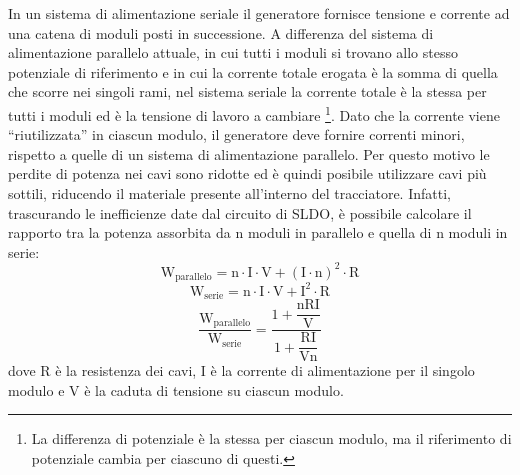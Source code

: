In un sistema di alimentazione seriale il generatore fornisce tensione e corrente ad una catena di moduli posti in successione. 
A differenza del sistema di alimentazione parallelo attuale, in cui tutti i moduli si trovano allo stesso potenziale di riferimento e in cui la corrente totale erogata è la somma di quella che scorre nei singoli rami, nel sistema seriale la corrente totale è la stessa per tutti i moduli ed è la tensione di lavoro a cambiare
\footnote{
  La differenza di potenziale è la stessa per ciascun modulo, ma il riferimento di potenziale cambia per ciascuno di questi.
}.
Dato che la corrente viene ``riutilizzata'' in ciascun modulo, il generatore deve fornire correnti minori, rispetto a quelle di un sistema di alimentazione parallelo.
Per questo motivo le perdite di potenza nei cavi sono ridotte ed è quindi posibile utilizzare cavi più sottili, riducendo il materiale presente all'interno del tracciatore.
Infatti, trascurando le inefficienze date dal circuito di SLDO, è possibile calcolare il rapporto tra la potenza assorbita da n moduli in parallelo e quella di n moduli in serie:
\begin{equation}
\mathrm{W_{parallelo} = n \cdot I \cdot V + (I\cdot n)^2 \cdot R}
\end{equation}
\begin{equation}
\mathrm{W_{serie} = n \cdot I \cdot V + I^2 \cdot R}
\end{equation}
\begin{equation}
\mathrm{\frac{W_{parallelo}}{W_{serie}} = \frac{1+ \dfrac{nRI}{V}}{1+\dfrac{RI}{Vn}}}
\end{equation}
dove R è la resistenza dei cavi, I è la corrente di alimentazione per il singolo modulo e V è la caduta di tensione su ciascun modulo. 


